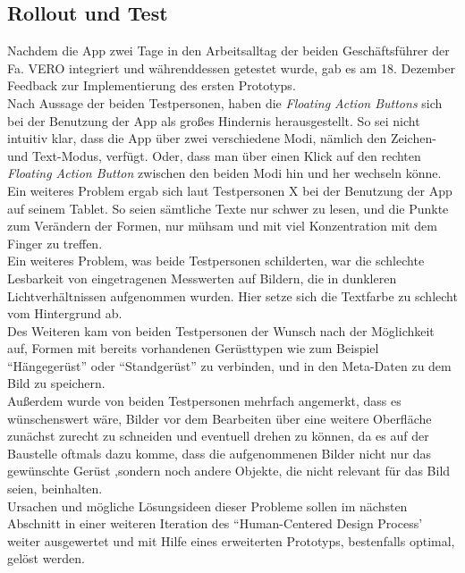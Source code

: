 \subsection{Rollout und Test}
Nachdem die App zwei Tage in den Arbeitsalltag der beiden Geschäftsführer der Fa. VERO integriert und währenddessen getestet wurde, gab es am 18. Dezember Feedback zur Implementierung des ersten Prototyps. \\

Nach Aussage der beiden Testpersonen, haben die \emph{Floating Action Buttons} sich bei der Benutzung der App als großes Hindernis herausgestellt.
So sei nicht intuitiv klar, dass die App über zwei verschiedene Modi, nämlich den Zeichen- und Text-Modus, verfügt.
Oder, dass man über einen Klick auf den rechten \emph{Floating Action Button} zwischen den beiden Modi hin und her wechseln könne. \\

Ein weiteres Problem ergab sich laut Testpersonen X  bei der Benutzung der App auf seinem Tablet.
So seien sämtliche Texte nur schwer zu lesen, und die Punkte zum Verändern der Formen, nur mühsam und mit viel Konzentration mit dem Finger zu treffen. \\

Ein weiteres Problem, was beide Testpersonen schilderten, war die schlechte Lesbarkeit von eingetragenen Messwerten auf Bildern, die in dunkleren Lichtverhältnissen aufgenommen wurden.
Hier setze sich die Textfarbe zu schlecht vom Hintergrund ab. \\

Des Weiteren kam von beiden Testpersonen der Wunsch nach der Möglichkeit auf, Formen mit bereits vorhandenen Gerüsttypen wie zum Beispiel ``Hängegerüst'' oder ``Standgerüst'' zu verbinden, und in den Meta-Daten zu dem Bild zu speichern. \\

Außerdem wurde von beiden Testpersonen mehrfach angemerkt, dass es wünschenswert wäre, Bilder vor dem Bearbeiten über eine weitere Oberfläche zunächst zurecht zu schneiden und eventuell drehen zu können, da es auf der Baustelle oftmals dazu komme, dass die aufgenommenen Bilder nicht nur das gewünschte Gerüst ,sondern noch andere Objekte, die nicht relevant für das Bild seien, beinhalten. \\

Ursachen und mögliche Lösungsideen dieser Probleme sollen im nächsten Abschnitt in einer weiteren Iteration des ``Human-Centered Design Process' weiter ausgewertet und mit Hilfe eines erweiterten Prototyps, bestenfalls optimal, gelöst werden.
